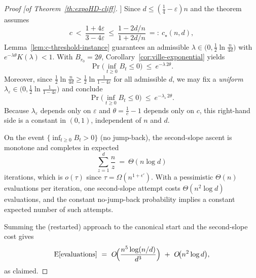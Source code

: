 \begin{proof}[Proof [of Theorem~\ref{th:expoHD-cliff}]]
	Since $d\le(\tfrac14-\varepsilon)n$ and the theorem assumes
	\[
	c\ <\ \frac{1+4\varepsilon}{3-4\varepsilon}\ \le\ \frac{1-2d/n}{1+2d/n}\ =:\ c_\star(n,d),
	\]
	Lemma~\ref{lem:c-threshold-instance} guarantees an admissible $\lambda\in\big(0,\tfrac12\ln\tfrac{n}{4d}\big)$ with $e^{-\lambda\theta}K(\lambda)<1$.
	With $B_{r_0}=2\theta$, Corollary~\ref{cor:ville-exponential} yields
	\[
	\Pr\!\Big(\inf_{t\ge 0} B_t\le 0\Big)\ \le\ e^{-\lambda\,2\theta}.
	\]
	Moreover, since $\tfrac12\ln\!\tfrac{n}{4d}\ge \tfrac12\ln\!\tfrac{1}{1-4\varepsilon}$ for all admissible $d$, we may fix a \emph{uniform} $\lambda_\varepsilon\in\big(0,\tfrac12\ln\tfrac{1}{1-4\varepsilon}\big)$ and conclude
	\[
	\Pr\!\Big(\inf_{t\ge 0} B_t\le 0\Big)\ \le\ e^{-\lambda_\varepsilon\,2\theta}.
	\]
	Because $\lambda_\varepsilon$ depends only on $\varepsilon$ and $\theta=\tfrac1c-1$ depends only on $c$, this right-hand side is a constant in $(0,1)$, independent of $n$ and $d$.
	
	\smallskip
	On the event $\{\inf_{t\ge 0} B_t>0\}$ (no jump-back), the second-slope ascent is monotone and completes in expected
	\[
	\sum_{z=1}^{d}\frac{n}{z}\ =\ \Theta(n\log d)
	\]
	iterations, which is $o(\tau)$ since $\tau=\Omega(n^{1+\epsilon'})$. With a pessimistic $\Theta(n)$ evaluations per iteration, one second-slope attempt costs $\Theta(n^{2}\log d)$ evaluations, and the constant no-jump-back probability implies a constant expected number of such attempts.
	
	\smallskip

	Summing the (restarted) approach to the canonical start and the second-slope cost gives
	\[
	\text{E}[\text{evaluations}]
	\ =\ O\!\Big(\frac{n^{5}\log(n/d)}{d^{3}}\Big)\ +\ O\!\big(n^{2}\log d\big),
	\]
	as claimed.
\end{proof}

